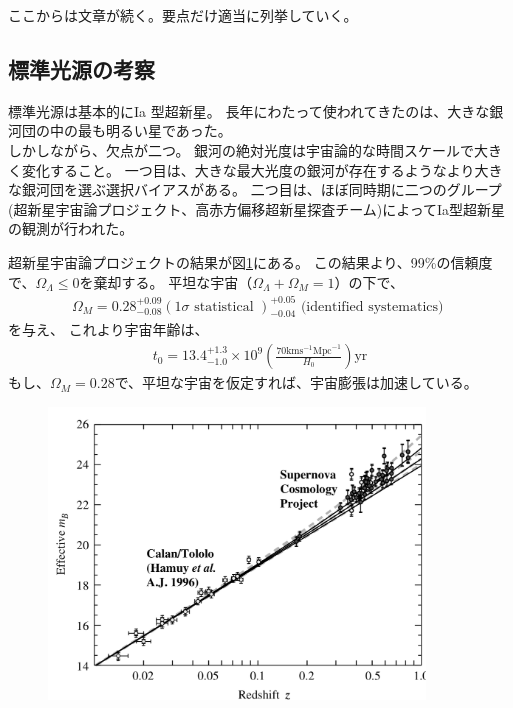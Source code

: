 \documentclass[11pt]{ltjsarticle}
\theoremstyle{plain}
\theoremstyle{break}
\begin{document}
ここからは文章が続く。要点だけ適当に列挙していく。

\subsection{標準光源の考察}
標準光源は基本的にIa 型超新星。
長年にわたって使われてきたのは、大きな銀河団の中の最も明るい星であった。\\
しかしながら、欠点が二つ。
銀河の絶対光度は宇宙論的な時間スケールで大きく変化すること。
一つ目は、大きな最大光度の銀河が存在するようなより大きな銀河団を選ぶ選択バイアスがある。
二つ目は、ほぼ同時期に二つのグループ(超新星宇宙論プロジェクト、高赤方偏移超新星探査チーム)によってIa型超新星の観測が行われた。

超新星宇宙論プロジェクトの結果が図\ref{fig:1-1}にある。
この結果より、99\%の信頼度で、$\Omega_{\Lambda} \leq 0$を棄却する。
平坦な宇宙（$\Omega_{\Lambda} + \Omega_{M} = 1$）の下で、
\begin{align}
  \Omega_{M}=0.28_{-0.08}^{+0.09}(1 \sigma \text { statistical })_{-0.04}^{+0.05} \text { (identified systematics) }
\end{align}%
を与え、
これより宇宙年齢は、
\begin{align}
  t_{0}=13.4_{-1.0}^{+1.3} \times 10^{9}\left(\frac{70 \mathrm{km} \mathrm{s}^{-1} \mathrm{Mpc}^{-1}}{H_{0}}\right) \mathrm{yr}
\end{align}%
もし、$\Omega_M = 0.28$で、平坦な宇宙を仮定すれば、宇宙膨張は加速している。
\begin{figure}[h]
	\centering
	\includegraphics[width=10cm]{figure/fig1-1}
	\label{fig:1-1}
	\caption{}
\end{figure}%
\end{document}

